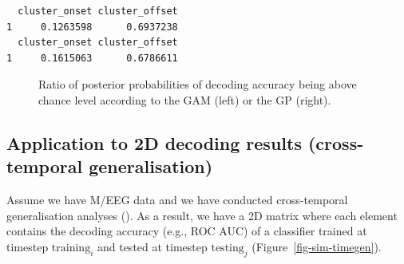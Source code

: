 \documentclass[
  doc,
  floatsintext,
  longtable,
  a4paper,
  nolmodern,
  notxfonts,
  notimes,
  colorlinks=true,linkcolor=blue,citecolor=blue,urlcolor=blue]{apa7}
\begin{document}
\begin{verbatim}
  cluster_onset cluster_offset
1     0.1263598      0.6937238
  cluster_onset cluster_offset
1     0.1615063      0.6786611
\end{verbatim}

\begin{figure}[!htb]

\caption{\label{fig-decoding-ratio}Ratio of posterior probabilities of
decoding accuracy being above chance level according to the GAM (left)
or the GP (right).}


\end{figure}%

\newpage

\subsection{Application to 2D decoding results (cross-temporal
generalisation)}\label{application-to-2d-decoding-results-cross-temporal-generalisation}

Assume we have M/EEG data and we have conducted cross-temporal
generalisation analyses (). As a result, we have a 2D matrix where each element contains the
decoding accuracy (e.g., ROC AUC) of a classifier trained at timestep
\(\text{training}_{i}\) and tested at timestep \(\text{testing}_{j}\)
(Figure~\ref{fig-sim-timegen}).
\end{document}
